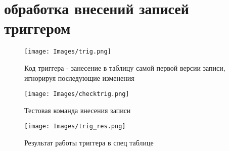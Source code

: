 \section{обработка внесений записей триггером}

\begin{figure}[h]
\centering
\texttt{[image: Images/trig.png]}
\caption{Код триггера - занесение в таблицу самой первой версии записи, игнорируя последующие изменения}
\end{figure}

\begin{figure}[h]
\centering
\texttt{[image: Images/checktrig.png]}
\caption{Тестовая команда внесения записи}
\end{figure}

\begin{figure}[h]
\centering
\texttt{[image: Images/trig\_res.png]}
\caption{Результат работы триггера в спец таблице}
\end{figure}